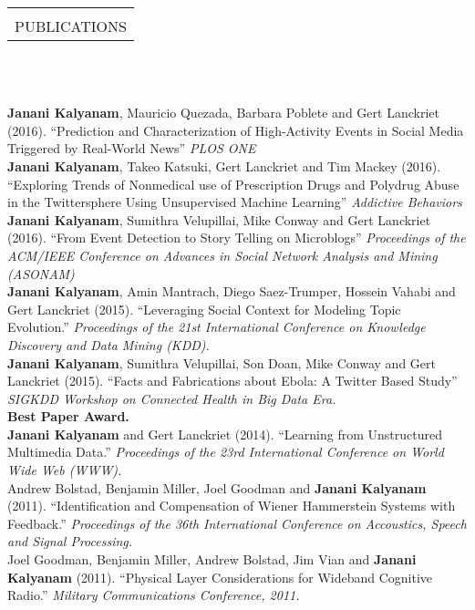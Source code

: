 \documentclass[11pt]{article}
\makeatletter
\newcommand{\secheader}[1]{

  {\begin{tabularx}{\textwidth}{@{}X}
    \midrule[0.095em] \\ \addlinespace[-1.2em]
     \uppercase{\large{#1}} \\
  \end{tabularx}\hfill\\\\}
}
\makeatother
\begin{document}
\secheader{Publications}
\textbf{Janani Kalyanam}, Mauricio Quezada, Barbara Poblete and Gert Lanckriet (2016). 
``Prediction and Characterization of High-Activity Events in Social Media Triggered by Real-World News''
\textit{PLOS ONE} \\

\textbf{Janani Kalyanam}, Takeo Katsuki, Gert Lanckriet and Tim Mackey (2016).
``Exploring Trends of Nonmedical use of Prescription Drugs and Polydrug Abuse in the Twittersphere Using Unsupervised Machine Learning''
\textit{Addictive Behaviors} \\

\textbf{Janani Kalyanam}, Sumithra Velupillai, Mike Conway and Gert Lanckriet (2016).
``From Event Detection to Story Telling on Microblogs''
\textit{Proceedings of the ACM/IEEE Conference on Advances in Social Network Analysis and Mining (ASONAM)} \\

\textbf{Janani Kalyanam}, Amin Mantrach, Diego Saez-Trumper, Hossein Vahabi and Gert Lanckriet (2015). 
``Leveraging Social Context for Modeling Topic Evolution.''
\textit{Proceedings of the 21st International Conference on Knowledge Discovery and Data Mining (KDD).} \\

\textbf{Janani Kalyanam}, Sumithra Velupillai, Son Doan, Mike Conway and
Gert Lanckriet (2015). ``Facts and Fabrications about Ebola:  A Twitter
Based Study'' \textit{SIGKDD Workshop on Connected Health in Big Data Era.} \\
\textbf{Best Paper Award.}\\

\textbf{Janani Kalyanam} and Gert Lanckriet (2014). 
``Learning from Unstructured Multimedia Data.'' \textit{Proceedings of the
23rd International Conference on World Wide Web (WWW).} \\

Andrew Bolstad, Benjamin Miller, Joel Goodman and \textbf{Janani Kalyanam} (2011). 
``Identification and Compensation of Wiener Hammerstein Systems with Feedback.'' 
\textit{Proceedings of the 36th International Conference on Accoustics, Speech and
Signal Processing.} \\

Joel Goodman, Benjamin Miller, Andrew Bolstad, Jim Vian and \textbf{Janani Kalyanam} (2011). 
``Physical Layer Considerations for Wideband Cognitive Radio.''
\textit{Military Communications Conference, 2011.} \\
\end{document}
